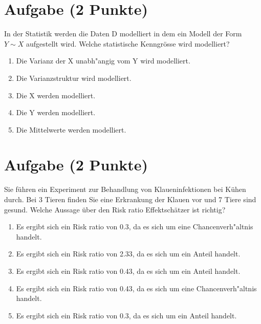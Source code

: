 \documentclass[a4paper, 10pt]{scrartcl}\usepackage[]{graphicx}\usepackage[]{xcolor}
\begin{document}
\section{Aufgabe \hfill (2 Punkte)}

In der Statistik werden die Daten D modelliert in dem ein Modell der Form
$Y \sim X$ aufgestellt wird. Welche statistische Kenngr{\"o}sse wird modelliert? 



\begin{enumerate}
\item [\textbf{A} \msquare] Die Varianz der X unabh{"a}ngig vom Y wird modelliert.
\item [\textbf{B} \msquare] Die Varianzstruktur wird modelliert.
\item [\textbf{C} \msquare] Die X werden modelliert.
\item [\textbf{D} \msquare] Die Y werden modelliert.
\item [\textbf{E} \msquare] Die Mittelwerte werden modelliert.
\end{enumerate}

\section{Aufgabe \hfill (2 Punkte)}



Sie f{\"u}hren ein Experiment zur Behandlung von Klaueninfektionen bei K{\"u}hen
durch. Bei 3 Tieren finden Sie eine Erkrankung der Klauen vor und
7 Tiere sind gesund. Welche Aussage {\"u}ber den Risk ratio
Effektsch{\"a}tzer ist richtig?



\begin{enumerate}
\item [\textbf{A} \msquare] Es ergibt sich ein Risk ratio von 0.3, da es sich um eine Chancenverh{"a}ltnis handelt.
\item [\textbf{B} \msquare] Es ergibt sich ein Risk ratio von 2.33, da es sich um ein Anteil handelt.
\item [\textbf{C} \msquare] Es ergibt sich ein Risk ratio von 0.43, da es sich um ein Anteil handelt.
\item [\textbf{D} \msquare] Es ergibt sich ein Risk ratio von 0.43, da es sich um eine Chancenverh{"a}ltnis handelt.
\item [\textbf{E} \msquare] Es ergibt sich ein Risk ratio von 0.3, da es sich um ein Anteil handelt.
\end{enumerate}
\end{document}
